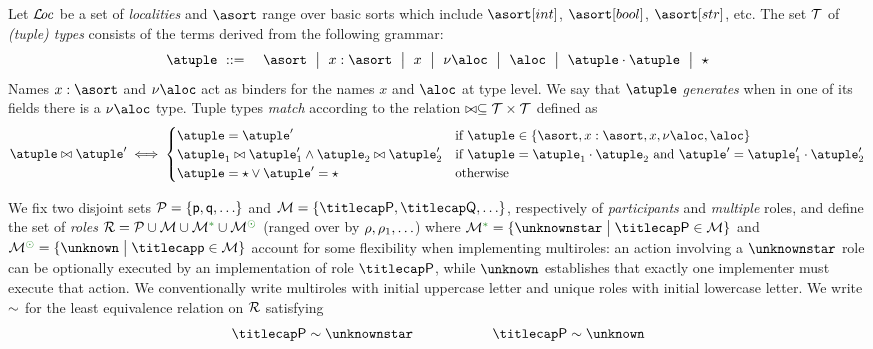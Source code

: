 %
Let $\mathcal{L}\!\mathit{oc}$ be a set of \emph{localities} and $\asort$ range over
basic sorts which include $\asort[int]$, $\asort[bool]$,
$\asort[str]$, etc.
%
The set $\mathcal{T}$ of \emph{(tuple) types} consists of the terms
derived from the following grammar:
\begin{eqnarray*}
  \atuple & \bnfdef & \asort \bnfmid
                      x : \asort \bnfmid
                      x  \bnfmid
                      \nu \aloc \bnfmid
                      \aloc \bnfmid
                      \atuple \cdot \atuple \bnfmid
                      \wildcard
\end{eqnarray*}
Names $x : \asort$ and $\nu \aloc$ act as binders for the names $x$
and $\aloc$ at type level.
%
We say that $\atuple$ \emph{generates} when in one of its fields there
is a $\nu \aloc$ type.
%
Tuple types \emph{match} according to the relation
$\bowtie \subseteq \mathcal{T} \times \mathcal{T}$ defined as
\[
  \atuple \matches \atuple' \iff
  \begin{cases}
    \atuple = \atuple'  
    & 
    \text{if $\atuple\in\{\asort, x : \asort, x, \nu \aloc, \aloc\}$}
    \\
    \atuple_1 \matches \atuple'_1
    \land \atuple_2 \matches \atuple'_2
    &
    \text{if } \atuple = \atuple_1 \cdot \atuple_2
    \text{ and }  \atuple' = \atuple'_1 \cdot \atuple'_2
    \\
    \atuple = \wildcard \vee \atuple' = \wildcard & \text{otherwise}
  \end{cases}
\]

%

We fix two disjoint sets $\participants = \{\ptp p, \ptp q, \ldots\}$
and $\multiroles = \{\amulti P, \amulti Q, \ldots \}$, respectively of
\emph{participants} and \emph{multiple} roles, and define the set of
\emph{roles}
$\roleset = \participants \cup \multiroles \cup
\multiroles^\unknownstarop \cup \multiroles^\unknownop$ (ranged over
by $\rho, \rho_1, \ldots$) where
$\multiroles^{\unknownstarop} = \{\unknownstar \sst \amulti P
\in\multiroles\}$ and
$\multiroles^{\unknownop} = \{ \unknown \sst \amulti p \in \multiroles
\}$ account for some flexibility when implementing multiroles: an
action involving a $\unknownstar$ role can be optionally executed by
an implementation of role $\amulti P$, while $\unknown$ establishes
that exactly one implementer must execute that action.
%
We conventionally write multiroles with initial uppercase letter and
unique roles with initial lowercase letter.
%
We write $\sim$ for the least equivalence relation on $\mathcal{R}$
satisfying
\[\amulti P \eqR \unknownstar \hspace{2cm} \amulti P \eqR \unknown\]

